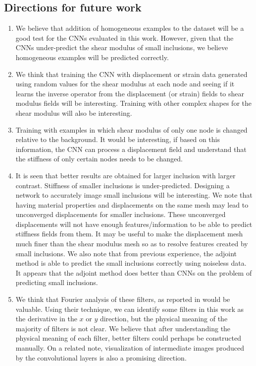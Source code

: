 \documentclass[10pt]{article}
\begin{document}
\subsection{Directions for future work}
\begin{enumerate}
\item{We believe that addition of homogeneous examples to the dataset will be a good test for the CNNs evaluated in this work. However, given that the CNNs under-predict the shear modulus of small inclusions, we believe homogeneous examples will be predicted correctly.}
\item{We think that training the CNN with displacement or strain data generated using random values for the shear modulus at each node and seeing if it learns the inverse operator from the displacement (or strain) fields to shear modulus fields will be interesting. Training with other complex shapes for the shear modulus will also be interesting.}
\item{Training with examples in which shear modulus of only one node is changed relative to the background. It would be interesting, if based on this information, the CNN can process a displacement field and understand that the stiffness of only certain nodes needs to be changed.}
\item{It is seen that better results are obtained for larger inclusion with larger contrast. Stiffness of smaller inclusions is under-predicted. Designing a network to accurately image small inclusions will be interesting. We note that having material properties and displacements on the same mesh may lead to unconverged displacements for smaller inclusions. These unconverged displacements will not have enough features/information to be able to predict stiffness fields from them. It may be useful to make the displacement mesh much finer than the shear modulus mesh so as to resolve features created by small inclusions. We also note that from previous experience, the adjoint method \cite{paper:oberai2003,paper:gokhale2008,paper:goenezen2011} is able to predict the small inclusions correctly using noiseless data. It appears that the adjoint method does better than CNNs on the problem of predicting small inclusions.}
\item{We think that Fourier analysis of these filters, as reported in \cite{paper:pateloberai2019} would be valuable. Using their technique, we can identify some filters in this work as the derivative in the $x$ or $y$ direction, but the physical meaning of the majority of filters is not clear. We believe that after understanding the physical meaning of each filter, better filters could perhaps be constructed manually. On a related note, visualization of intermediate images produced by the convolutional layers is also a promising direction.}

\end{enumerate}
\end{document}
